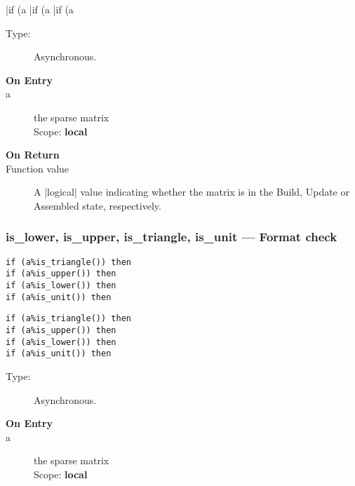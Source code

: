 \fortinline|if (a%
\fortinline|if (a%
\fortinline|if (a%

\begin{description}
\item[Type:] Asynchronous.
\item[\bf On Entry]
\item[a] the sparse matrix\\
Scope: {\bf local}\\
\end{description}

\begin{description}
\item[\bf On Return]
\item[Function value] A \fortinline|logical| value indicating whether the
  matrix is in the Build, Update or Assembled state, respectively. 
\end{description}

\subsubsection{is\_lower, is\_upper, is\_triangle, is\_unit  ---
  Format  check}

\ifpdf
\begin{verbatim}
if (a%is_triangle()) then 
if (a%is_upper()) then 
if (a%is_lower()) then 
if (a%is_unit()) then 
\end{verbatim}
\else
\begin{verbatim}
if (a%is_triangle()) then 
if (a%is_upper()) then 
if (a%is_lower()) then 
if (a%is_unit()) then 
\end{verbatim}
\fi

\begin{description}
\item[Type:] Asynchronous.
\item[\bf On Entry]
\item[a] the sparse matrix\\
Scope: {\bf local}\\
\end{description}

